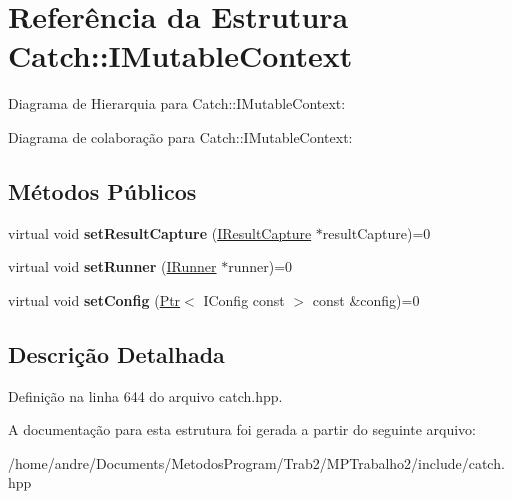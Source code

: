 \hypertarget{structCatch_1_1IMutableContext}{}\section{Referência da Estrutura Catch\+:\+:I\+Mutable\+Context}
\label{structCatch_1_1IMutableContext}


Diagrama de Hierarquia para Catch\+:\+:I\+Mutable\+Context\+:


Diagrama de colaboração para Catch\+:\+:I\+Mutable\+Context\+:
\subsection*{Métodos Públicos}
\begin{DoxyCompactItemize}
\item 
virtual void {\bfseries set\+Result\+Capture} (\hyperlink{structCatch_1_1IResultCapture}{I\+Result\+Capture} $\ast$result\+Capture)=0\hypertarget{structCatch_1_1IMutableContext_a4a80afd0525b7def21bee8d9b48f2d39}{}\label{structCatch_1_1IMutableContext_a4a80afd0525b7def21bee8d9b48f2d39}

\item 
virtual void {\bfseries set\+Runner} (\hyperlink{structCatch_1_1IRunner}{I\+Runner} $\ast$runner)=0\hypertarget{structCatch_1_1IMutableContext_af2e53b1dea4527a2587cff266a730f6e}{}\label{structCatch_1_1IMutableContext_af2e53b1dea4527a2587cff266a730f6e}

\item 
virtual void {\bfseries set\+Config} (\hyperlink{classCatch_1_1Ptr}{Ptr}$<$ I\+Config const  $>$ const \&config)=0\hypertarget{structCatch_1_1IMutableContext_a04ae4f4219a481a7bf658d9fd445bc1d}{}\label{structCatch_1_1IMutableContext_a04ae4f4219a481a7bf658d9fd445bc1d}

\end{DoxyCompactItemize}


\subsection{Descrição Detalhada}


Definição na linha 644 do arquivo catch.\+hpp.



A documentação para esta estrutura foi gerada a partir do seguinte arquivo\+:\begin{DoxyCompactItemize}
\item 
/home/andre/\+Documents/\+Metodos\+Program/\+Trab2/\+M\+P\+Trabalho2/include/catch.\+hpp\end{DoxyCompactItemize}
